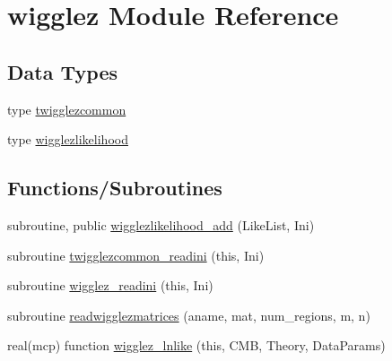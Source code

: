 \hypertarget{namespacewigglez}{}\section{wigglez Module Reference}
\label{namespacewigglez}
\subsection*{Data Types}
\begin{DoxyCompactItemize}
\item 
type \mbox{\hyperlink{structwigglez_1_1twigglezcommon}{twigglezcommon}}
\item 
type \mbox{\hyperlink{structwigglez_1_1wigglezlikelihood}{wigglezlikelihood}}
\end{DoxyCompactItemize}
\subsection*{Functions/\+Subroutines}
\begin{DoxyCompactItemize}
\item 
subroutine, public \mbox{\hyperlink{namespacewigglez_ae540392aa1fd56601b1db55cac9aaafa}{wigglezlikelihood\+\_\+add}} (Like\+List, Ini)
\item 
subroutine \mbox{\hyperlink{namespacewigglez_a0ccc7d6e7495d4d98fe5df0ae058145a}{twigglezcommon\+\_\+readini}} (this, Ini)
\item 
subroutine \mbox{\hyperlink{namespacewigglez_ae3e0c03dabaa4af8dbaa3d5b1b2acb29}{wigglez\+\_\+readini}} (this, Ini)
\item 
subroutine \mbox{\hyperlink{namespacewigglez_af7eacad18112700eeba576ce8376cb89}{readwigglezmatrices}} (aname, mat, num\+\_\+regions, m, n)
\item 
real(mcp) function \mbox{\hyperlink{namespacewigglez_abf254c63c44f0ccf748dd90a0814a664}{wigglez\+\_\+lnlike}} (this, C\+MB, Theory, Data\+Params)
\end{DoxyCompactItemize}

